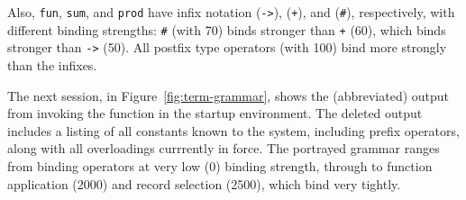 Also, \verb+fun+, \verb+sum+, and \verb+prod+ have infix
notation (\verb+->+), (\verb|+|), and (\verb+#+), respectively, with
different binding strengths: \verb+#+ (with 70) binds stronger than
\verb|+| (60), which  binds stronger than \verb+->+ (50). All postfix
type operators (with 100) bind more strongly than the infixes.

The next session, in Figure~\ref{fig:term-grammar}, shows the
(abbreviated) output from invoking the  function in
the startup \HOL{} environment. The deleted output includes a listing
of all constants known to the system, including prefix operators,
along with all overloadings currrently in force. The portrayed grammar
ranges from binding operators at very low (0) binding strength,
through to function application (2000) and record selection (2500),
which bind very tightly.

